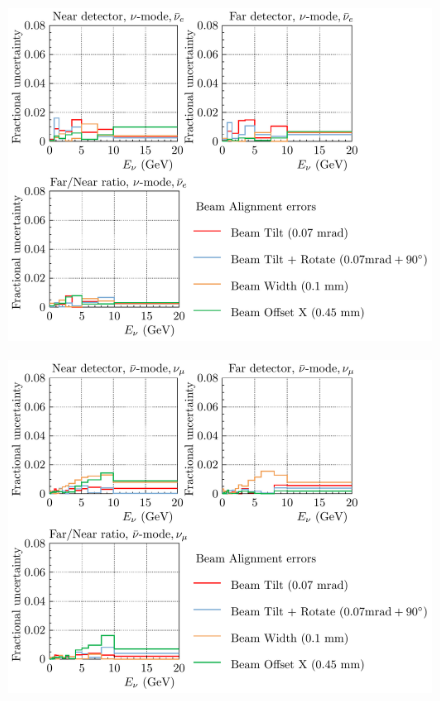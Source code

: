 \documentclass{article}
\begin{document}
\begin{figure}
  \includegraphics[width=\textwidth]{plots/fracerrs/numode_nuebar_BeamAlignment}
  \caption{}
  \label{fig:beamalign_nu_nuebar}
\end{figure}

\begin{figure}
  \includegraphics[width=\textwidth]{plots/fracerrs/nubarmode_numu_BeamAlignment}
  \caption{}
  \label{fig:beamalign_nubar_numu}
\end{figure}
\end{document}
